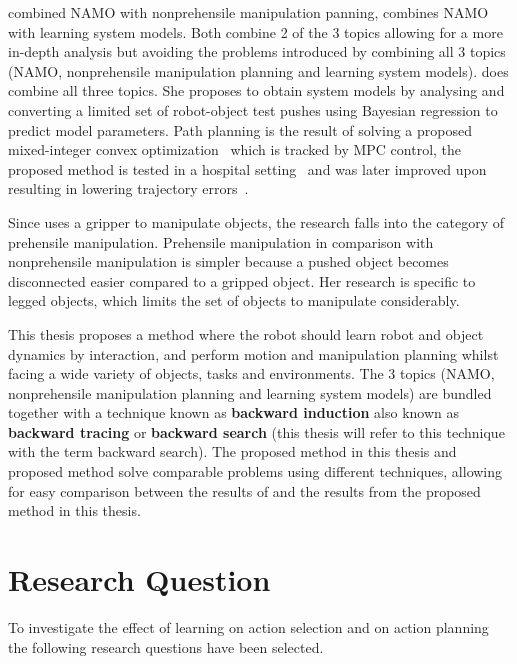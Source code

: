 \citeauthor{vega-brown_asymptotically_2020} combined \ac{NAMO} with nonprehensile manipulation panning, \citeauthor{wang_affordancebased_2020} combines \ac{NAMO} with learning system models. Both combine 2 of the 3 topics allowing for a more in-depth analysis but avoiding the problems introduced by combining all 3 topics (\ac{NAMO}, nonprehensile manipulation planning and learning system models). \citeauthor{sabbaghnovin_model_2021} does combine all three topics. She proposes to obtain system models by analysing and converting a limited set of robot-object test pushes using Bayesian regression to predict model parameters. Path planning is the result of solving a proposed mixed-integer convex optimization~\cite{sabbaghnovin_optimal_2016} which is tracked by \ac{MPC} control, the proposed method is tested in a hospital setting~\cite{novin_dynamic_2018} and was later improved upon resulting in lowering trajectory errors~\cite{sabbaghnovin_model_2021}.\bs


Since \citeauthor{sabbaghnovin_model_2021} uses a gripper to manipulate objects, the research falls into the category of prehensile manipulation. Prehensile manipulation in comparison with nonprehensile manipulation is simpler because a pushed object becomes disconnected easier compared to a gripped object. Her research is specific to legged objects, which limits the set of objects to manipulate considerably.\bs

This thesis proposes a method where the robot should learn robot and object dynamics by interaction, and perform motion and manipulation planning whilst facing a wide variety of objects, tasks and environments. The 3 topics (\ac{NAMO}, nonprehensile manipulation planning and learning system models) are bundled together with a technique known as \textbf{backward induction} also known as \textbf{backward tracing} or \textbf{backward search} (this thesis will refer to this technique with the term backward search). The proposed method in this thesis and \citeauthor{sabbaghnovin_model_2021} proposed method solve comparable problems using different techniques, allowing for easy comparison between the results of \citeauthor{sabbaghnovin_model_2021} and the results from the proposed method in this thesis.\bs
{}

\section{Research Question}%
\label{sec:research_question}
To investigate the effect of learning on action selection and on action planning the following research questions have been selected.\bs


